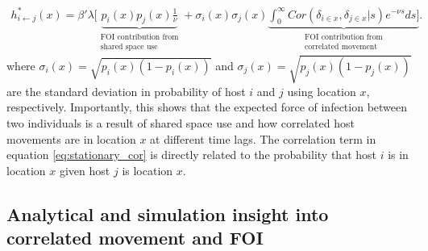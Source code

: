 \documentclass[letterpaper]{article}
\begin{document}
\begin{equation}
    \begin{aligned}
    h^*_{i \leftarrow j}(x) = \beta' \lambda [ \underbrace{p_i(x)p_j(x) \frac{1}{\nu}}_{\substack{\text{FOI contribution from} \\ \text{shared space use}}} + \sigma_i(x) \sigma_j(x) \underbrace{\int_{0}^{\infty} Cor(\delta_{i \in x}, \delta_{j \in x} | s) e^{-\nu s} ds]}_{\substack{\text{FOI contribution from} \\ \text{correlated movement}}}.
    \end{aligned}
    \label{eq:stationary_cor}
\end{equation}
where $\sigma_i(x) = \sqrt{p_i(x)(1 - p_i(x))}$  and $\sigma_j(x) = \sqrt{p_j(x)(1 - p_j(x))}$ are the standard deviation in probability of host $i$ and $j$ using location $x$, respectively.  Importantly, this shows that the expected force of infection between two individuals is a result of shared space use and how correlated host movements are in location $x$ at different time lags.  The correlation term in equation \ref{eq:stationary_cor} is directly related to the probability that host $i$ is in location $x$ given host $j$ is location $x$. 

\subsection*{Analytical and simulation insight into correlated movement and FOI}
\end{document}

